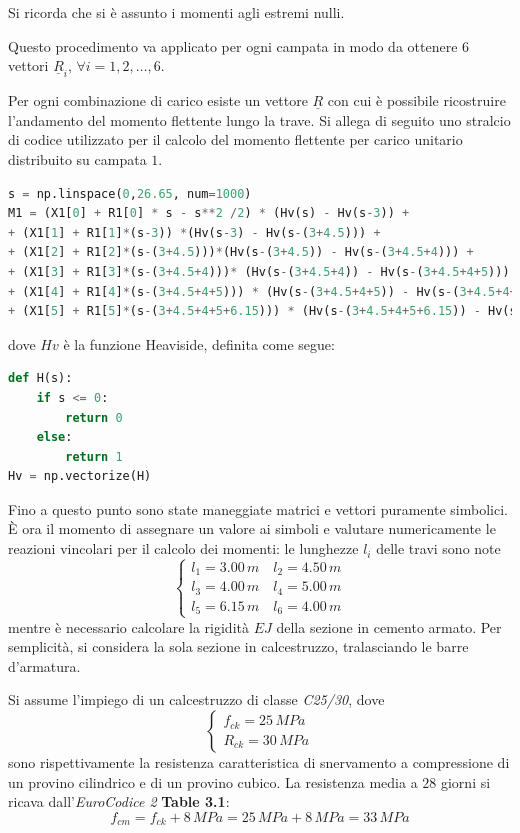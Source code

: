 Si ricorda che si è assunto i momenti agli estremi nulli.

Questo procedimento va applicato per ogni campata in modo da ottenere $6$ vettori $\underline{R}_i$, $\forall i=1, 2, \dots, 6$.

Per ogni combinazione di carico esiste un vettore $\underline{R}$ con cui è possibile ricostruire l'andamento del momento flettente lungo la trave. 
Si allega di seguito uno stralcio di codice utilizzato per il calcolo del momento flettente per carico unitario distribuito su campata $1$.

\begin{lstlisting}[language=Python]
s = np.linspace(0,26.65, num=1000)
M1 = (X1[0] + R1[0] * s - s**2 /2) * (Hv(s) - Hv(s-3)) + 
+ (X1[1] + R1[1]*(s-3)) *(Hv(s-3) - Hv(s-(3+4.5))) + 
+ (X1[2] + R1[2]*(s-(3+4.5)))*(Hv(s-(3+4.5)) - Hv(s-(3+4.5+4))) + 
+ (X1[3] + R1[3]*(s-(3+4.5+4)))* (Hv(s-(3+4.5+4)) - Hv(s-(3+4.5+4+5))) + 
+ (X1[4] + R1[4]*(s-(3+4.5+4+5))) * (Hv(s-(3+4.5+4+5)) - Hv(s-(3+4.5+4+5+6.15))) + 
+ (X1[5] + R1[5]*(s-(3+4.5+4+5+6.15))) * (Hv(s-(3+4.5+4+5+6.15)) - Hv(s-(3+4.5+4+5+6.15+4)))
\end{lstlisting}
dove $Hv$ è la funzione Heaviside, definita come segue:

\begin{lstlisting}[language=Python]
def H(s):
    if s <= 0:
        return 0
    else:
        return 1
Hv = np.vectorize(H)
\end{lstlisting}

Fino a questo punto sono state maneggiate matrici e vettori puramente simbolici. È ora il momento di  assegnare un valore ai simboli e valutare numericamente le reazioni vincolari per il calcolo dei momenti: le lunghezze $l_i$ delle travi sono note
\begin{equation*}
 \begin{cases}
  l_1 = 3.00\,m \quad l_2 = 4.50\,m\\
  l_3 = 4.00\,m \quad l_4 = 5.00\,m\\
  l_5 = 6.15\,m \quad l_6 = 4.00\,m
 \end{cases}
\end{equation*}
mentre è necessario calcolare la rigidità $EJ$ della sezione in cemento armato. Per semplicità, si considera la sola sezione in calcestruzzo, tralasciando le barre d'armatura.

Si assume l'impiego di un calcestruzzo di classe \emph{C25/30}, dove
\begin{equation*}
 \begin{cases}
 	f_{ck} = 25\,MPa\\
 	R_{ck} = 30\,MPa
 \end{cases}
\end{equation*}
sono rispettivamente la resistenza caratteristica di snervamento a compressione di un provino cilindrico e di un provino cubico. La resistenza media a $28$ giorni si ricava dall'\emph{EuroCodice 2} \textbf{Table 3.1}:
\begin{equation*}
	f_{cm} = f_{ck} + 8\,MPa = 25\,MPa + 8\,MPa = 33\,MPa
\end{equation*}


